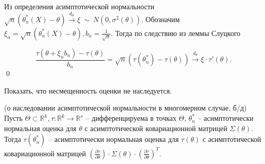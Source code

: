 Из определения асимптотической нормальности $\displaystyle \sqrt{n}\left( \theta _{n}^{*}( X) -\theta \right)\xrightarrow{d_{\theta }} \xi \ \sim \ N\left( 0,\sigma ^{2}( \theta )\right)$. Обозначим $\displaystyle \xi _{n} =\sqrt{n}\left( \theta _{n}^{*}( X) -\theta \right) ,b_{n} =\frac{1}{\sqrt{n}}$. Тогда по следствию из леммы Слуцкого


\begin{equation*}
\frac{\tau ( \theta +\xi _{n} b_{n}) -\tau ( \theta )}{b_{n}} =\sqrt{n}\left( \tau \left( \theta _{n}^{*}\right) -\tau ( \theta )\right)\xrightarrow{d_{\theta }} \xi \cdotp \tau '( \theta ) .
\end{equation*}
\qed 
\begin{exercise}
Показать, что несмещенность оценки не наследуется.
\end{exercise}
\begin{proposition}
(о наследовании асимптотической нормальности в многомерном случае, б/д) Пусть $\displaystyle \Theta \subset \mathbb{R}^{k} ,\tau :\mathbb{R}^{k}\rightarrow \mathbb{R}^{s}$ -- дифференцируема в точках $\displaystyle \Theta $, $\displaystyle \theta _{n}^{*}$ -- асимптотически нормальная оценка для $\displaystyle \theta $ с асимптотической ковариационной матрицей $\displaystyle \Sigma ( \theta )$. Тогда $\displaystyle \tau \left( \theta _{n}^{*}\right)$ -- асимптотически нормальная оценка для $\displaystyle \tau ( \theta )$ с асимптотической ковариационной матрицей $\displaystyle \left(\frac{\partial \tau }{\partial \theta }\right) \cdotp \Sigma ( \theta ) \cdotp \left(\frac{\partial \tau }{\partial \theta }\right)^{T}$.
\end{proposition}